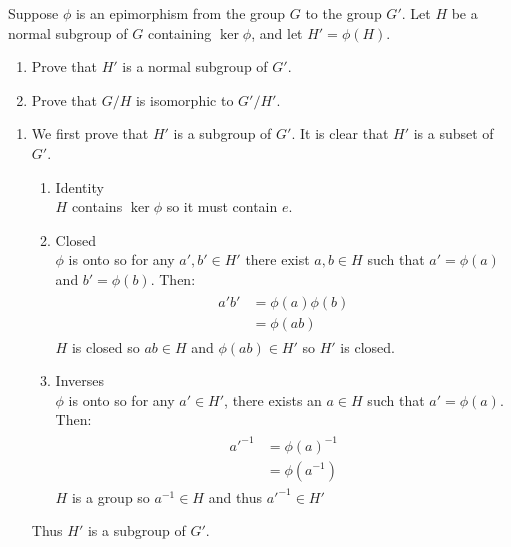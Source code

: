 \documentclass[paper=a4, fontsize=11pt]{jhwhw} %
\begin{document}
Suppose $\phi$ is an epimorphism from the group $G$ to the group $G'$. Let $H$ be a normal subgroup of $G$ containing $\ker \phi$, and let $H' = \phi(H)$.
\begin{enumerate}
    \item Prove that $H'$ is a normal subgroup of $G'$.
    \item Prove that $G/H$ is isomorphic to $G'/H'$.
\end{enumerate}
\solution
\begin{enumerate}
    \item
        We first prove that $H'$ is a subgroup of $G'$. It is clear that $H'$ is a subset of $G'$.
        \begin{enumerate}
            \item Identity\\
                $H$ contains $\ker\phi$ so it must contain $e$.
            \item Closed\\
                $\phi$ is onto so for any $a', b'\in H'$ there exist $a, b\in H$ such that $a' = \phi(a)$ and $b'= \phi(b)$. Then:
                \begin{align}
                    \begin{split}
                        a'b' &= \phi(a)\phi(b)\\
                             &= \phi(ab)
                    \end{split}
                \end{align}
                $H$ is closed so $ab\in H$ and $\phi(ab)\in H'$ so $H'$ is closed.
            \item Inverses\\
                $\phi$ is onto so for any $a'\in H'$, there exists an $a\in H$ such that $a' = \phi(a)$. Then:
                \begin{align}
                    \begin{split}
                        a'^{-1} &= \phi(a)^{-1}\\
                                &= \phi(a^{-1})
                    \end{split}
                \end{align}
                $H$ is a group so $a^{-1}\in H$ and thus $a'^{-1}\in H'$
        \end{enumerate}
        Thus $H'$ is a subgroup of $G'$.



\end{enumerate}
\end{document}

